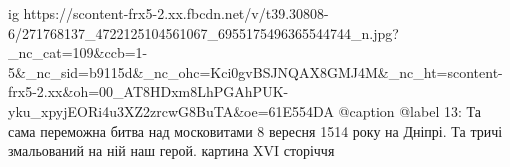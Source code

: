  
 
 
 
 

\ifcmt
  ig https://scontent-frx5-2.xx.fbcdn.net/v/t39.30808-6/271768137_4722125104561067_6955175496365544744_n.jpg?_nc_cat=109&ccb=1-5&_nc_sid=b9115d&_nc_ohc=Kci0gvBSJNQAX8GMJ4M&_nc_ht=scontent-frx5-2.xx&oh=00_AT8HDxm8LhPGAhPUK-yku_xpyjEORi4u3XZ2zrcwG8BuTA&oe=61E554DA
  @caption @label 13: Та сама переможна битва над московитами 8 вересня 1514 року на Дніпрі. Та тричі змальований на ній наш герой. картина XVI сторіччя
\fi
